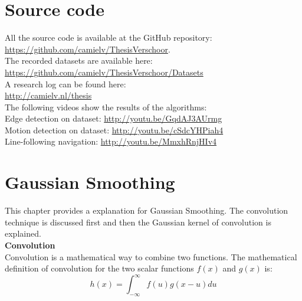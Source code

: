 \documentclass[a4paper]{article}
\begin{document}
\newpage
\begin{appendices}
\section{Source code}
\label{SOURCE_CODE}
All the source code is available at the GitHub repository:\\ \url{https://github.com/camielv/ThesisVerschoor}.\\
The recorded datasets are available here:\\
\url{https://github.com/camielv/ThesisVerschoor/Datasets}\\
A research log can be found here:\\
\url{http://camielv.nl/thesis}\\
The following videos show the results of the algorithms:\\
Edge detection on dataset: \url{http://youtu.be/GqdAJ3AUrmg}\\
Motion detection on dataset: \url{http://youtu.be/cSdcYHPiah4}\\
Line-following navigation: \url{http://youtu.be/MmxhRnjHIv4}

\newpage
\section{Gaussian Smoothing}
\label{GAUSSIAN_SMOOTHING}
This chapter provides a explanation for Gaussian Smoothing. The convolution technique is discussed first and then the Gaussian kernel of convolution is explained.\\

\noindent\textbf{Convolution}\\
Convolution is a mathematical way to combine two functions. The mathematical definition of convolution for the two scalar functions $f(x)$ and $g(x)$ is:
\begin{equation*}
h(x) = \int_{-\infty}^\infty f(u)g(x - u)du
\end{equation*}


\end{appendices}
\end{document}
